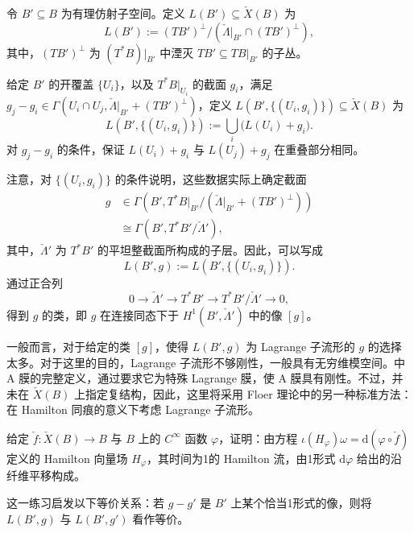 \begin{definition}\label{def:6.64}
令 $B'\subseteq B$ 为有理仿射子空间。定义 $L(B')\subseteq\check X(B)$ 为
\[
L(B'):=(TB')^\perp/(\check\Lambda|_{B'}\cap(TB')^\perp),
\]
其中，$(TB')^\perp$ 为 $(T^*B)|_{B'}$ 中湮灭 $TB'\subseteq TB|_{B'}$ 的子丛。

给定 $B'$ 的开覆盖 $\{U_i\}$，以及 $T^*B|_{U_i}$ 的截面 $g_i$，满足 $g_j-g_i\in\Gamma(U_i\cap U_j,\check\Lambda|_{B'}+(TB')^\perp)$，定义 $L(B',\{(U_i,g_i)\})\subseteq\check X(B)$ 为
\[
L(B',\{(U_i,g_i)\}):=\bigcup_i\bigl(L(U_i)+g_i\bigr).
\]
对 $g_j-g_i$ 的条件，保证 $L(U_i)+g_i$ 与 $L(U_j)+g_j$ 在重叠部分相同。

注意，对 $\{(U_i,g_i)\}$ 的条件说明，这些数据实际上确定截面
\[
\begin{aligned}
g&\in\Gamma(B',T^*B|_{B'}/(\check\Lambda|_{B'}+(TB')^\perp))\\
&\cong\Gamma(B',T^*B'/\check\Lambda'),
\end{aligned}
\]
其中，$\check\Lambda'$ 为 $T^*B'$ 的平坦整截面所构成的子层。因此，可以写成
\[
L(B',g):=L(B',\{(U_i,g_i)\}).
\]
通过正合列
\[
0\longrightarrow\check\Lambda'\longrightarrow T^*B'
\longrightarrow T^*B'/\check\Lambda'\longrightarrow0,
\]
得到 $g$ 的类，即 $g$ 在连接同态下于 $H^1(B',\check\Lambda')$ 中的像 $[g]$。\BookQED
\end{definition}

一般而言，对于给定的类 $[g]$，使得 $L(B',g)$ 为 Lagrange 子流形的 $g$ 的选择太多。对于这里的目的，Lagrange 子流形不够刚性，一般具有无穷维模空间。中 A 膜的完整定义，通过要求它为特殊 Lagrange 膜，使 A 膜具有刚性。不过，并未在 $\check X(B)$ 上指定复结构，因此，这里将采用 Floer 理论中的另一种标准方法：在 Hamilton 同痕的意义下考虑 Lagrange 子流形。

\begin{exercise}\label{exer:6.65}
给定 $\check f\colon\check X(B)\to B$ 与 $B$ 上的 $C^\infty$ 函数 $\varphi$，证明：由方程 $\iota(H_\varphi)\omega=\mathrm d(\varphi\circ\check f)$ 定义的 Hamilton 向量场 $H_\varphi$，其时间为1的 Hamilton 流，由1形式 $\mathrm d\varphi$ 给出的沿纤维平移构成。
\end{exercise}

这一练习启发以下等价关系：若 $g-g'$ 是 $B'$ 上某个恰当1形式的像，则将 $L(B',g)$ 与 $L(B',g')$ 看作等价。

